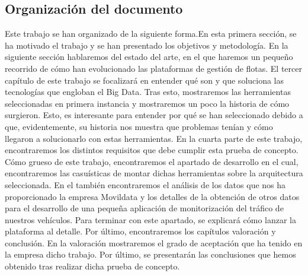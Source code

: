 \subsection{Organización del documento\label{organizacion}}
Este trabajo se han organizado de la siguiente forma.En esta primera sección, se ha motivado el trabajo y se han presentado los objetivos y metodología. En la siguiente sección hablaremos del estado del arte, en el que haremos un pequeño recorrido de cómo han evolucionado las plataformas de gestión de flotas. El tercer capítulo de este trabajo se focalizará en entender qué son y que soluciona las tecnologías que engloban el Big Data. Tras esto, mostraremos las herramientas seleccionadas en primera instancia y mostraremos un poco la historia de cómo surgieron. Esto, es interesante para entender por qué se han seleccionado debido a que, evidentemente, su historia nos muestra que problemas tenían y cómo llegaron a solucionarlo con estas herramientas. En la cuarta parte de este trabajo, encontraremos los distintos requisitos que debe cumplir esta prueba de concepto. Cómo grueso de este trabajo, encontraremos el apartado de desarrollo en el cual, encontraremos las casuísticas de montar dichas herramientas sobre la arquitectura seleccionada. En el también encontraremos el análisis de los datos que nos ha proporcionado la empresa Movildata y los detalles de la obtención de otros datos para el desarrollo de una pequeña aplicación de monitorización del tráfico de nuestros vehículos. Para terminar con este apartado, se explicará cómo lanzar la plataforma al detalle. Por último, encontraremos los capítulos valoración y conclusión. En la valoración mostraremos el grado de aceptación que ha tenido en la empresa dicho trabajo. Por último, se presentarán las conclusiones que hemos obtenido tras realizar dicha prueba de concepto.


